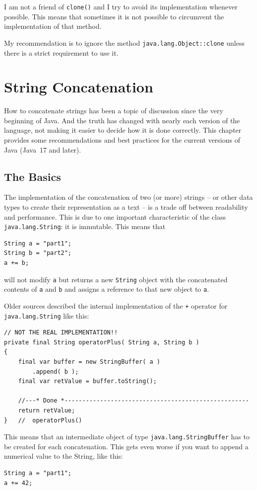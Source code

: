 \documentclass[11pt,a4paper, titlepage, parskip=half, headsepline, footsepline, cleardoublepage=current, headheight=1cm]{scrbook}
\begin{document}
I am not a friend of \lstinline|clone()| and I try to avoid its implementation whenever possible. This means that sometimes it is not possible to circumvent the implementation of that method.

My recommendation is to ignore the method \lstinline|java.lang.Object::clone| unless there is a strict requirement to use it.

\section{String Concatenation}
How to concatenate strings has been a topic of discussion since the very beginning of Java. And the truth has changed with nearly each version of the language, not making it easier to decide how it is done correctly. This chapter provides some recommendations and best practices for the current versions of Java (Java~17 and later).

\subsection{The Basics}
The implementation of the concatenation of two (or more) strings – or other data types to create their representation as a text – is a trade off between readability and performance. This is due to one important characteristic of the class \lstinline|java.lang.String|\autocite{ORACLE_DOC_STRING_CLASS}: it is immutable. This means that
\begin{lstlisting}
String a = "part1";
String b = "part2";
a += b;
\end{lstlisting}
will not modify \lstinline|a| but returns a new \lstinline|String| object with the concatenated contents of \lstinline|a| and \lstinline|b| and assigns a reference to that new object to \lstinline|a|.

Older sources described the internal implementation of the \lstinline|+| operator for \lstinline|java.lang.String| like this:
\begin{lstlisting}
// NOT THE REAL IMPLEMENTATION!!
private final String operatorPlus( String a, String b )
{
    final var buffer = new StringBuffer( a )
        .append( b );
    final var retValue = buffer.toString();
    
    //---* Done *----------------------------------------------------
    return retValue;
}   //  operatorPlus()
\end{lstlisting}

This means that an intermediate object of type \lstinline|java.lang.StringBuffer|\autocite{ORACLE_DOC_STRINGBUFFER_CLASS} has to be created for each concatenation. This gets even worse if you want to append a numerical value to the String, like this:
\begin{lstlisting}
String a = "part1";
a += 42;
\end{lstlisting}
\end{document}
